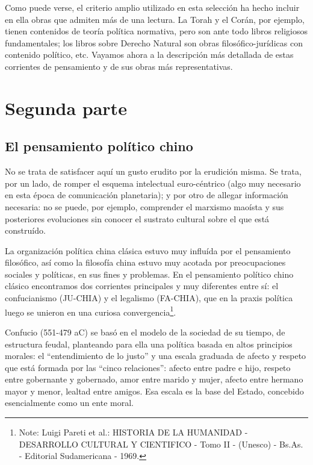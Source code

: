 \documentclass[
]{book}
\begin{document}
Como puede verse, el criterio amplio utilizado en esta selección ha hecho incluir en ella obras que admiten más de una lectura. La Torah y el Corán, por ejemplo, tienen contenidos de teoría política normativa, pero son ante todo libros religiosos fundamentales; los libros sobre Derecho Natural son obras filosófico-jurídicas con contenido político, etc. Vayamos ahora a la descripción más detallada de estas corrientes de pensamiento y de sus obras más representativas.

\hypertarget{segunda-parte-1}{%
\section*{Segunda parte}\label{segunda-parte-1}}

\hypertarget{el-pensamiento-poluxedtico-chino}{%
\subsection*{El pensamiento político chino}\label{el-pensamiento-poluxedtico-chino}}

No se trata de satisfacer aquí un gusto erudito por la erudición misma. Se trata, por un lado, de romper el esquema intelectual euro-céntrico (algo muy necesario en esta época de comunicación planetaria); y por otro de allegar información necesaria: no se puede, por ejemplo, comprender el marxismo maoísta y sus posteriores evoluciones sin conocer el sustrato cultural sobre el que está construído.

La organización política china clásica estuvo muy influída por el pensamiento filosófico, así como la filosofía china estuvo muy acotada por preocupaciones sociales y políticas, en sus fines y problemas. En el pensamiento político chino clásico encontramos dos corrientes principales y muy diferentes entre sí: el confucianismo (JU-CHIA) y el legalismo (FA-CHIA), que en la praxis política luego se unieron en una curiosa convergencia\footnote{Note: Luigi Pareti et al.: HISTORIA DE LA HUMANIDAD - DESARROLLO CULTURAL Y CIENTIFICO - Tomo II - (Unesco) - Bs.As. - Editorial Sudamericana - 1969.}.

Confucio (551-479 aC) se basó en el modelo de la sociedad de su tiempo, de estructura feudal, planteando para ella una política basada en altos principios morales: el ``entendimiento de lo justo'' y una escala graduada de afecto y respeto que está formada por las ``cinco relaciones'': afecto entre padre e hijo, respeto entre gobernante y gobernado, amor entre marido y mujer, afecto entre hermano mayor y menor, lealtad entre amigos. Esa escala es la base del Estado, concebido esencialmente como un ente moral.
\end{document}
